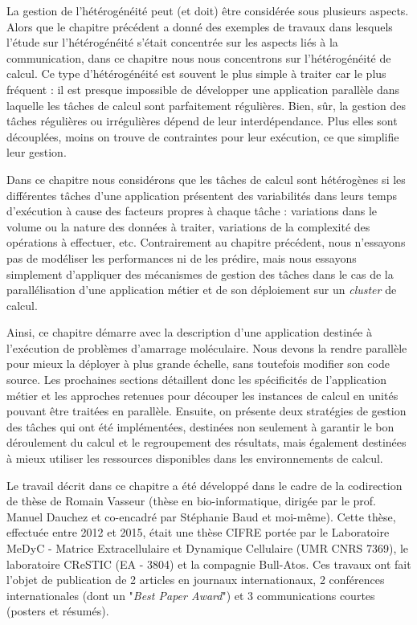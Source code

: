 \begin{resume}
La gestion de l'hétérogénéité peut (et doit) être considérée sous plusieurs aspects. Alors que le chapitre précédent a donné des exemples de travaux dans lesquels l'étude sur l'hétérogénéité s'était concentrée sur les aspects liés à la communication, dans ce chapitre nous nous concentrons sur l'hétérogénéité de calcul. Ce type d'hétérogénéité est souvent le plus simple à traiter car le plus fréquent : il est presque impossible de développer une application parallèle dans laquelle les tâches de calcul sont parfaitement régulières. Bien, sûr, la gestion des tâches régulières ou irrégulières dépend de leur interdépendance. Plus elles sont découplées, moins on trouve de contraintes pour leur exécution, ce que simplifie leur gestion.

Dans ce chapitre nous considérons que les tâches de calcul sont hétérogènes si les différentes tâches d'une application présentent des variabilités dans leurs temps d'exécution à cause des facteurs propres à chaque tâche : variations dans le volume ou la nature des données à traiter, variations de la complexité des opérations à effectuer, etc. Contrairement au chapitre précédent, nous n'essayons pas de modéliser les performances ni de les prédire, mais nous essayons simplement d'appliquer des mécanismes de gestion des tâches dans le cas de la parallélisation d'une application métier et de son déploiement sur un \textit{cluster} de calcul.

Ainsi, ce chapitre démarre avec la description d'une application destinée à l'exécution de problèmes d'amarrage moléculaire. Nous devons la rendre parallèle pour mieux la déployer à plus grande échelle, sans toutefois modifier son code source. Les prochaines sections détaillent donc les spécificités de l'application métier et les approches retenues pour découper les instances de calcul en unités pouvant être traitées en parallèle. Ensuite, on présente deux stratégies de gestion des tâches qui ont été implémentées, destinées non seulement à garantir le bon déroulement du calcul et le regroupement des résultats, mais également destinées à mieux utiliser les ressources disponibles dans les environnements de calcul.

Le travail décrit dans ce chapitre a été développé dans le cadre de la codirection de thèse de Romain Vasseur (thèse en bio-informatique, dirigée par le prof. Manuel Dauchez et co-encadré par Stéphanie Baud et moi-même). Cette thèse, effectuée entre 2012 et 2015, était une thèse CIFRE portée par le Laboratoire MeDyC - Matrice Extracellulaire et Dynamique Cellulaire (UMR CNRS 7369), le laboratoire CReSTIC (EA - 3804) et la compagnie Bull-Atos. Ces travaux ont fait l'objet de publication de 2 articles en journaux internationaux, 2 conférences internationales (dont un "\textit{Best Paper Award}") et 3 communications courtes (posters et résumés).

\end{resume}

